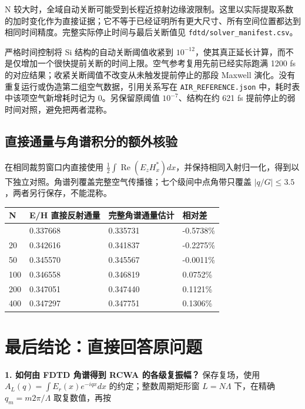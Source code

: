 \documentclass[
  chinese,
  UTF8,
  a4paper,
  11pt]{ctexart}
\newcounter{none} %
\begin{document}
N
较大时，全域自动关断可能受到长程近掠射边缘波限制。这里以实际提取系数的加时变化作为直接证据；它不等于已经证明所有更大尺寸、所有空间位置都达到相同时间精度。完整实际停止时间与最后关断值见
\texttt{fdtd/solver\_manifest.csv}。

严格时间控制将 Si 结构的自动关断阈值收紧到
\(10^{-12}\)，使其真正延长计算，而不是仅增加一个很快提前关断的时间上限。空气参考复用先前已经实际跑满
1200 fs 的对应结果；收紧关断阈值不改变从未触发提前停止的那段 Maxwell
演化。没有重复运行或伪造第二组空气数据，引用关系写在
\texttt{AIR\_REFERENCE.json} 中，耗时表中该项空气新增耗时记为
0。另保留原阈值 \(10^{-7}\)、结构在约 621 fs
提前停止的弱时间对照，避免把两者混称。

\subsection{直接通量与角谱积分的额外核验}\label{ux76f4ux63a5ux901aux91cfux4e0eux89d2ux8c31ux79efux5206ux7684ux989dux5916ux6838ux9a8c}

在相同裁剪窗口内直接使用
\(\tfrac12\int\operatorname{Re}(E_zH_x^*)dx\)，并保持相同入射归一化，得到以下独立对照。角谱列覆盖完整空气传播锥；七个级间中点角带只覆盖
\(|q/G|\leq3.5\)，两者另行保存，不能混称。

{\def\LTcaptype{none} %
\begin{longtable}[]{@{}llll@{}}
\toprule\noalign{}
N & E/H 直接反射通量 & 完整角谱通量估计 & 相对差 \\
\midrule\noalign{}
\endhead
\bottomrule\noalign{}
\endlastfoot
10 & 0.337668 & 0.335731 & -0.5738\% \\
20 & 0.342616 & 0.341837 & -0.2275\% \\
50 & 0.345570 & 0.345567 & -0.0011\% \\
100 & 0.346558 & 0.346819 & 0.0752\% \\
200 & 0.347051 & 0.347440 & 0.1121\% \\
400 & 0.347297 & 0.347751 & 0.1306\% \\
\end{longtable}
}

\section{最后结论：直接回答原问题}\label{ux6700ux540eux7ed3ux8bbaux76f4ux63a5ux56deux7b54ux539fux95eeux9898}

\textbf{1. 如何由 FDTD 角谱得到 RCWA 的各级复振幅？} 保存复场，使用
\(A_L(q)=\int E_r(x)e^{-iqx}dx\) 的约定；整数周期矩形窗 \(L=N\Lambda\)
下，在精确 \(q_m=m2\pi/\Lambda\) 取复数值，再按
\end{document}
